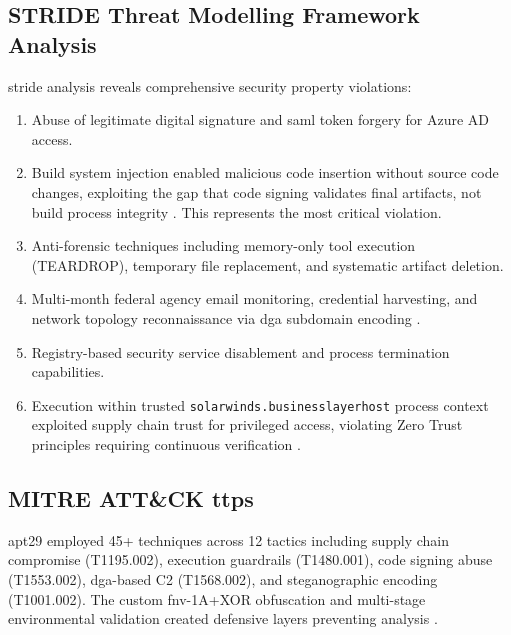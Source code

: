 \subsection{STRIDE Threat Modelling Framework Analysis}

\gls{stride} analysis \cite{kohnfelder_threats_1999} reveals comprehensive security property violations:

\begin{enumerate}
    \item {} Abuse of legitimate digital signature and \gls{saml} token forgery for Azure AD access.
    \item {} Build system injection enabled malicious code insertion without source code changes, exploiting the gap that code signing validates final artifacts, not build process integrity \cite{eckels_sunburst_2020}. This represents the most critical violation.
    \item {} Anti-forensic techniques including memory-only tool execution (TEARDROP), temporary file replacement, and systematic artifact deletion.
    \item {} Multi-month federal agency email monitoring, credential harvesting, and network topology reconnaissance via \gls{dga} subdomain encoding \cite{us_open_2021}.
    \item {} Registry-based security service disablement and process termination capabilities.
    \item {} Execution within trusted \texttt{solarwinds.businesslayerhost} process context exploited supply chain trust for privileged access, violating Zero Trust principles requiring continuous verification \cite{rose_zero_2020}.
\end{enumerate}

\subsection{MITRE ATT\&CK \gls{ttp}s}
\gls{apt}29 employed 45+ techniques across 12 tactics \cite{mitre_apt29_2025, mitre_solarwinds_2025} including supply chain compromise (T1195.002), execution guardrails (T1480.001), code signing abuse (T1553.002), \gls{dga}-based C2 (T1568.002), and steganographic encoding (T1001.002). The custom \gls{fnv}-1A+XOR obfuscation and multi-stage environmental validation created defensive layers preventing analysis \cite{eckels_sunburst_2020, mandiant_highly_2020}.

